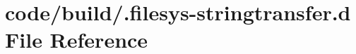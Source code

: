 \section{code/build/.filesys-\/stringtransfer.d File Reference}
\label{_8filesys-stringtransfer_8d}
